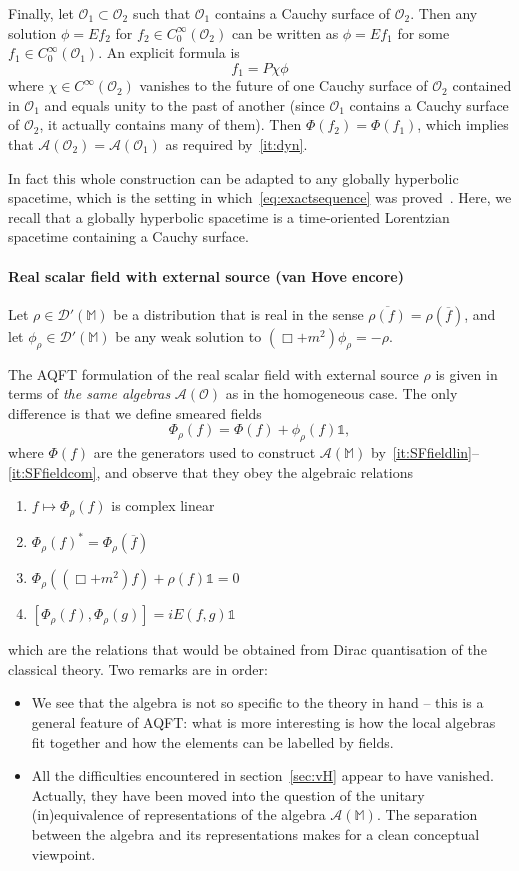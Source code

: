 \documentclass[12pt,a4paper]{article}
\newcommand{\1}{\mathds{1}}                         %
\newcommand{\Ocal}{\mathcal{O}}
\newcommand{\MM}{\mathbb{M}}
\newcommand{\DD}{{\mathscr{D}}}
\newcommand{\II}{{\mathbb{1}}}
\newcommand{\Ac}{{\mathcal{A}}}
\newcommand{\CoinX}[1]{C_0^\infty(#1)}
\begin{document}
	Finally, let $\Ocal_1\subset \Ocal_2$ such that $\Ocal_1$ contains a Cauchy surface of $\Ocal_2$. Then any solution $\phi=Ef_2$ for $f_2\in\CoinX{\Ocal_2}$ can be written as
	$\phi=Ef_1$ for some $f_1\in\CoinX{\Ocal_1}$. An explicit formula is 
	\[
	f_1 = P \chi \phi
	\]
	where $\chi\in C^\infty(\Ocal_2)$ vanishes to the future of one Cauchy surface of $\Ocal_2$ contained in $\Ocal_1$ and equals unity to the past of another (since $\Ocal_1$ contains a Cauchy surface of $\Ocal_2$, it actually contains many of them).
	Then $\Phi(f_2)=\Phi(f_1)$, which implies that $\Ac(\Ocal_2)=\Ac(\Ocal_1)$ as required by~\ref{it:dyn}. 
	
	In fact this whole construction can be adapted to any globally hyperbolic spacetime, which is the setting in which~\eqref{eq:exactsequence} was proved~\cite{BarGinouxPfaffle}. Here, we recall that a globally hyperbolic spacetime is a time-oriented Lorentzian spacetime containing a Cauchy surface. 
	
	\paragraph{Real scalar field with external source (van Hove encore)} Let $\rho\in\DD'(\MM)$ be a distribution that is real in the sense $\overline{\rho(f)}=\rho(\overline{f})$, and let $\phi_\rho\in\DD'(\MM)$ be any weak solution to $(\Box+m^2)\phi_\rho= -\rho$. 
	
	The AQFT formulation of the real scalar field with external source $\rho$ is given in terms of \emph{the same algebras} $\Ac(\Ocal)$ as in the homogeneous case. The only difference is that we define smeared fields 
	\[
	\Phi_\rho(f) =\Phi(f) +\phi_\rho(f)\II ,
	\]
	where $\Phi(f)$ are the generators used to construct $\Ac(\MM)$ by~\ref{it:SFfieldlin}--\ref{it:SFfieldcom},
	and observe that they obey the algebraic relations 
		\begin{enumerate}[label=\bf vH\arabic{enumi},leftmargin=*,widest=4] 
		\item $f\mapsto \Phi_\rho(f)$ is complex linear 
		\item $\Phi_\rho(f)^*=\Phi_\rho(\overline{f})$ 
		\item $\Phi_\rho((\Box+ m^2)f)+\rho(f)\II=0$ 
		\item $[\Phi_\rho(f),\Phi_\rho(g)] = iE (f,g)\II$ 
	\end{enumerate}
	which are the relations that would be obtained from Dirac quantisation of the classical theory. 
	Two remarks are in order:
	\begin{itemize}
		\item We see that the algebra is not so specific to the theory in hand -- this is a general feature of AQFT: what is more interesting is how the local algebras fit together and how the elements can be labelled by fields.
		\item All the difficulties encountered in section~\ref{sec:vH} appear to have vanished. Actually, they have been moved into the question of the unitary (in)equivalence of
		representations of the algebra $\Ac(\MM)$. The separation between the algebra and its representations makes for a clean conceptual viewpoint. 
	\end{itemize}
	
\end{document}
